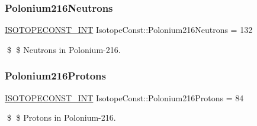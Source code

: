 \subsubsection{\texorpdfstring{Polonium216\+Neutrons}{Polonium216Neutrons}}
{\footnotesize\ttfamily \mbox{\hyperlink{group___isotope_const-_macros_ga5f18360b3e99483a35c32d789e62621c}{I\+S\+O\+T\+O\+P\+E\+C\+O\+N\+S\+T\+\_\+\+I\+NT}} Isotope\+Const\+::\+Polonium216\+Neutrons = 132}

\$ \$ Neutrons in Polonium-\/216. \mbox{\label{group___isotope_const-_polonium-_po216_gad6659107e87ab76fa03fd3566a098fbd}} 
\subsubsection{\texorpdfstring{Polonium216\+Protons}{Polonium216Protons}}
{\footnotesize\ttfamily \mbox{\hyperlink{group___isotope_const-_macros_ga5f18360b3e99483a35c32d789e62621c}{I\+S\+O\+T\+O\+P\+E\+C\+O\+N\+S\+T\+\_\+\+I\+NT}} Isotope\+Const\+::\+Polonium216\+Protons = 84}

\$ \$ Protons in Polonium-\/216. 